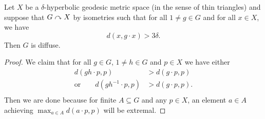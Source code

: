 \begin{theorem}[Delzant]
    \label{theorem:delzant}
    Let $X$ be a $\delta$-hyperbolic geodesic metric space (in the sense of thin triangles) and suppose that $G \curvearrowright X$ by isometries such that for all $1 \neq g \in G$ and for all $x \in X$, we have \[
        d(x, g \cdot x) > 3 \delta.
    \]
    Then $G$ is diffuse.
\end{theorem}

\begin{proof}
    We claim that for all $g \in G$, $1 \neq h \in G$ and $p \in X$ we have either \begin{align*}
        d(gh \cdot p, p)
            &> d(g \cdot p, p) \\
        \text{or} \qquad
        d(gh^{-1} \cdot p, p)
            &> d(g \cdot p, p). \\
    \end{align*}
    Then we are done because for finite $A \subseteq G$ and any $p \in X$, an element $a \in A$ achieving $\max_{a \in A} d(a \cdot p, p)$ will be extremal.


\end{proof}
